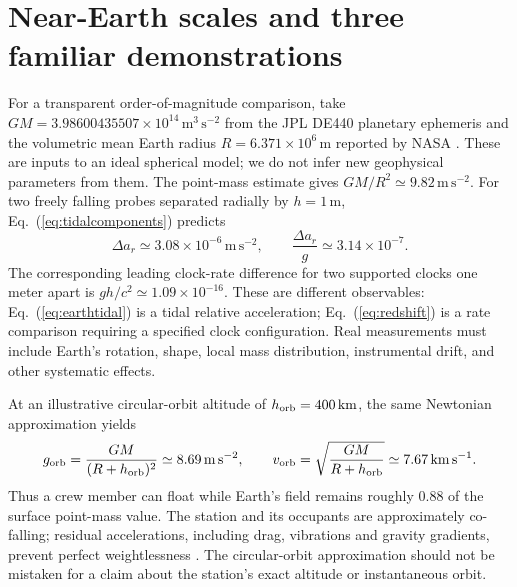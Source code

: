 \documentclass[11pt,letterpaper]{article}
\begin{document}
\section{Near-Earth scales and three familiar demonstrations}

For a transparent order-of-magnitude comparison, take $GM=3.98600435507\times10^{14}\,\mathrm{m^3\,s^{-2}}$ from the JPL DE440 planetary ephemeris and the volumetric mean Earth radius $R=6.371\times10^6\,\mathrm m$ reported by NASA \cite{JPLGM,NASAEarth}. These are inputs to an ideal spherical model; we do not infer new geophysical parameters from them. The point-mass estimate gives $GM/R^2\simeq9.82\,\mathrm{m\,s^{-2}}$. For two freely falling probes separated radially by $h=1\,\mathrm m$, Eq.~(\ref{eq:tidalcomponents}) predicts
\begin{equation}
 \Delta a_r\simeq3.08\times10^{-6}\,\mathrm{m\,s^{-2}},
 \qquad \frac{\Delta a_r}{g}\simeq3.14\times10^{-7}.
 \label{eq:earthtidal}
\end{equation}
The corresponding leading clock-rate difference for two supported clocks one meter apart is $gh/c^2\simeq1.09\times10^{-16}$. These are different observables: Eq.~(\ref{eq:earthtidal}) is a tidal relative acceleration; Eq.~(\ref{eq:redshift}) is a rate comparison requiring a specified clock configuration. Real measurements must include Earth's rotation, shape, local mass distribution, instrumental drift, and other systematic effects.

At an illustrative circular-orbit altitude of $h_{\rm orb}=400\,\mathrm{km}$, the same Newtonian approximation yields
\begin{equation}
 g_{\rm orb}=\frac{GM}{(R+h_{\rm orb})^2}\simeq8.69\,\mathrm{m\,s^{-2}},
 \qquad v_{\rm orb}=\sqrt{\frac{GM}{R+h_{\rm orb}}}\simeq7.67\,\mathrm{km\,s^{-1}}.
 \label{eq:orbit}
\end{equation}
Thus a crew member can float while Earth's field remains roughly $0.88$ of the surface point-mass value. The station and its occupants are approximately co-falling; residual accelerations, including drag, vibrations and gravity gradients, prevent perfect weightlessness \cite{NASAOrbit}. The circular-orbit approximation should not be mistaken for a claim about the station's exact altitude or instantaneous orbit.
\end{document}

